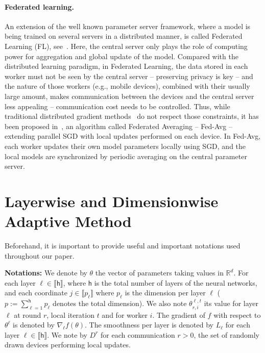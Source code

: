 \documentclass[11pt]{article}
\def\rset{\ensuremath{\mathbb{R}}}
\newcommand{\inter}{\llbracket n \rrbracket}
\def\tot{\mathsf{h}}
\begin{document}
\paragraph{Federated learning.}
An extension of the well known parameter server framework, where a model is being trained on several servers in a distributed manner, is called Federated Learning (FL), see~\cite{konevcny2016federated}.
Here, the central server only plays the role of computing power for aggregation and global update of the model.
Compared with the distributed learning paradigm, in Federated Learning, the data stored in each worker must not be seen by the central server -- preserving privacy is key -- and the nature of those workers (e.g., mobile devices), combined with their usually large amount, makes communication between the devices and the central server less appealing -- communication cost needs to be controlled.
Thus, while traditional distributed gradient methods~\cite{recht2011hogwild,li2014scaling,zhao2020distributed} do not respect those constraints, it has been proposed in~\cite{mcmahan2017communication}, an algorithm called Federated Averaging -- Fed-Avg -- extending parallel SGD with local updates performed on each device. 
In Fed-Avg, each worker updates their own model parameters locally using SGD, and the local models are synchronized by periodic averaging on the central parameter server.

\vspace{-0.1in}
\section{Layerwise and Dimensionwise Adaptive Method}\label{sec:main}
Beforehand, it is important to provide useful and important notations used throughout our paper.

\vspace{0.05in}
\textbf{Notations:} We denote by $\theta$ the vector of parameters taking values in $\rset^d$. 
For each layer $\ell \in \llbracket \tot \rrbracket$, where $\tot$ is the total number of layers of the neural networks, and each coordinate $j \in \llbracket p_\ell \rrbracket$ where $p_\ell$ is the dimension per layer $\ell$ ($p := \sum_{\ell=1}^\tot p_\ell$ denotes the total dimension).
We also note $\theta_{r,i}^{\ell,t}$ its value for layer $\ell$ at round $r$, local iteration $t$ and for worker $i$.
The gradient of $f$ with respect to $\theta^\ell$ is denoted by $\nabla_{\ell} f(\theta)$.
The smoothness per layer is denoted by $L_\ell$ for each layer $\ell \in \llbracket \tot \rrbracket$.
We note by $D^{r}$ for each communication $r>0$, the set of randomly drawn devices performing local updates.
\end{document}
